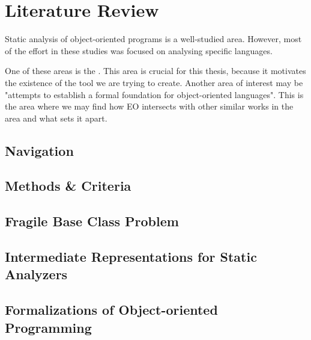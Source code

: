 \chapter{Literature Review}
\label{chap:lr}
Static analysis of object-oriented programs is a well-studied area. However, most of the effort in these studies was focused on analysing specific languages.

One of these areas is the . This area is crucial for this thesis, because it motivates the existence of the tool we are trying to create. Another area of interest may be "attempts to establish a formal foundation for object-oriented languages". This is the area where we may find how EO intersects with other similar works in the area and what sets it apart. 

\section{Navigation}

\section{Methods \& Criteria}

\section{Fragile Base Class Problem}

\section{Intermediate Representations for Static Analyzers}

\section{Formalizations of Object-oriented Programming}



\newpage
